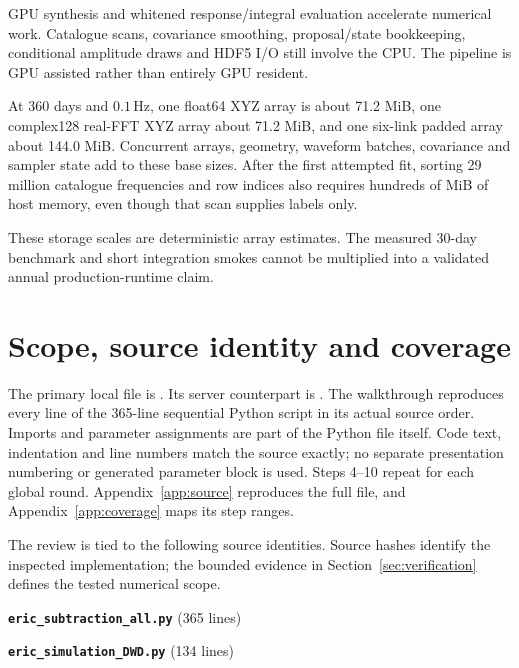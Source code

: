 \documentclass[11pt,a4paper]{article}
\newcommand{\code}[1]{\texttt{\nolinkurl{#1}}}
\newcommand{\Hz}{\,\mathrm{Hz}}
\begin{document}
GPU synthesis and whitened response/integral evaluation accelerate numerical
work. Catalogue scans, covariance smoothing, proposal/state bookkeeping,
conditional amplitude draws and HDF5 I/O still involve the CPU. The pipeline
is GPU assisted rather than entirely GPU resident.

At 360 days and \(0.1\Hz\), one float64 XYZ array is about 71.2 MiB, one
complex128 real-FFT XYZ array about 71.2 MiB, and one six-link padded array
about 144.0 MiB. Concurrent arrays, geometry, waveform batches, covariance
and sampler state add to these base sizes. After the first attempted fit,
sorting 29 million catalogue frequencies and row indices also requires
hundreds of MiB of host memory, even though that scan supplies labels only.

These storage scales are deterministic array estimates. The measured
30-day benchmark and short integration smokes cannot be multiplied into a
validated annual production-runtime claim.

\section{Scope, source identity and coverage}
\label{sec:scope}

The primary local file is
.
Its server counterpart is
.
The walkthrough reproduces every line of the 365-line sequential Python script
in its actual source order. Imports and parameter assignments are part of the
Python file itself. Code text, indentation and line numbers match the source
exactly; no separate presentation numbering or generated parameter block is
used. Steps 4--10 repeat for each global round. Appendix~\ref{app:source}
reproduces the full file, and Appendix~\ref{app:coverage} maps its step ranges.

The review is tied to the following source identities. Source hashes identify
the inspected implementation; the bounded evidence in
Section~\ref{sec:verification} defines the tested numerical scope.


\textbf{\code{eric_subtraction_all.py}} (365 lines)\\


\textbf{\code{eric_simulation_DWD.py}} (134 lines)\\
\end{document}
